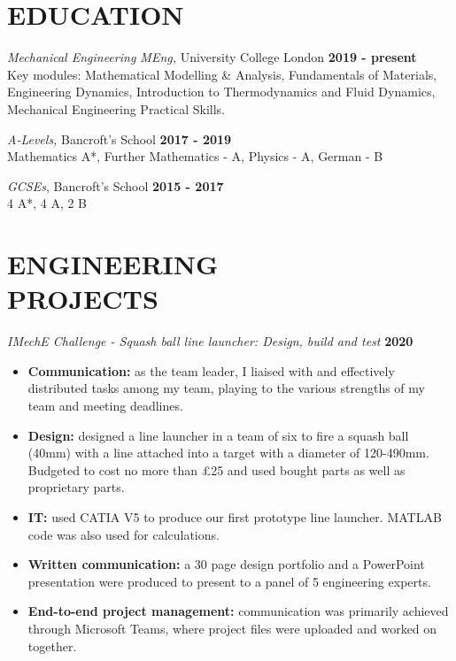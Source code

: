 \documentclass[margin, 10pt]{res} %
\begin{document}
\begin{resume}

 
\section{EDUCATION}  

{\sl Mechanical Engineering MEng,} University College London \hfill \textbf{2019 - present}\\
Key modules: Mathematical Modelling \& Analysis, Fundamentals of Materials,\\ 
Engineering Dynamics, Introduction to Thermodynamics and Fluid Dynamics, \\
Mechanical Engineering Practical Skills.

{\sl A-Levels,} Bancroft's School \hfill \textbf{2017 - 2019}\\
Mathematics A*, Further Mathematics - A, Physics - A, German - B

{\sl GCSEs}, Bancroft's School
\hfill \textbf{2015 - 2017}\\
4 A*, 4 A, 2 B



\section{ENGINEERING \\ PROJECTS}

{\sl IMechE Challenge - Squash ball line launcher: Design, build and test} \hfill \textbf{2020}\\
\begin{itemize}
  \item \textbf{Communication:} as the team leader, I liaised with and effectively distributed tasks among my team, playing to the various strengths of my team and meeting deadlines.
  \item \textbf{Design:} designed a line launcher in a team of six to fire a squash ball (40\si{\milli\meter}) with a line attached into a target with a diameter of 120-490\si{\milli\meter}. Budgeted to cost no more than £25 and used bought parts as well as proprietary parts.
  \item \textbf{IT:} used CATIA V5 to produce our first prototype line launcher. MATLAB code was also used for calculations. 
  \item \textbf{Written communication:} a 30 page design portfolio and a PowerPoint presentation were produced to present to a panel of 5 engineering experts. 
  \item \textbf{End-to-end project management:} communication was primarily achieved through Microsoft Teams, where project files were uploaded and worked on together. 
\end{itemize}
 

\end{resume}
\end{document}

